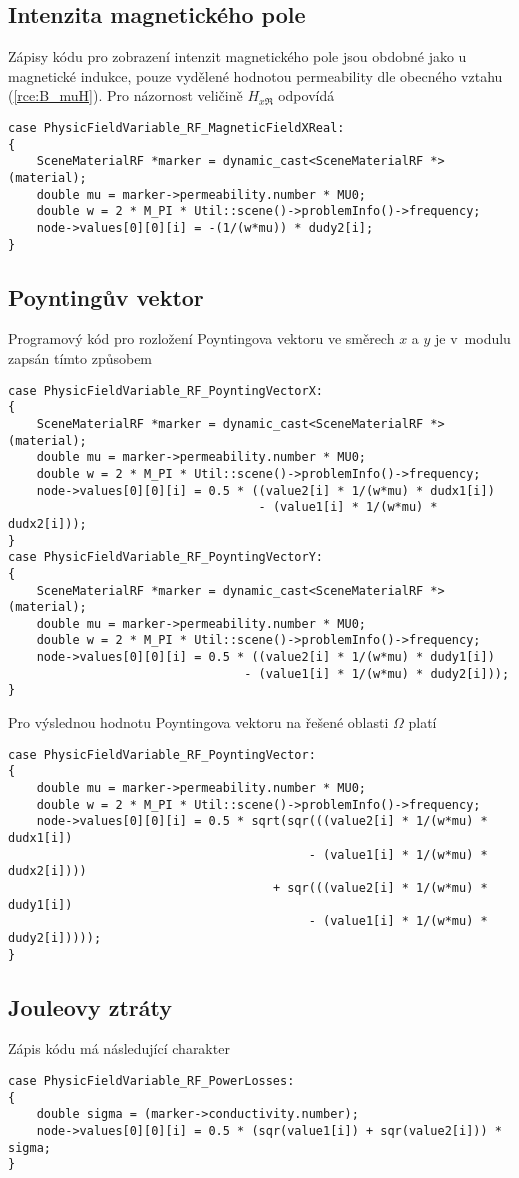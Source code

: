 \subsection*{Intenzita magnetického pole}
Zápisy kódu pro zobrazení intenzit magnetického pole jsou obdobné jako u magnetické indukce, pouze vydělené hodnotou permeability dle obecného vztahu (\ref{rce:B_muH}).
Pro názornost veličině $H_{x\Re}$ odpovídá
\begin{verbatim}
case PhysicFieldVariable_RF_MagneticFieldXReal:
{
    SceneMaterialRF *marker = dynamic_cast<SceneMaterialRF *>(material);
    double mu = marker->permeability.number * MU0;
    double w = 2 * M_PI * Util::scene()->problemInfo()->frequency;
    node->values[0][0][i] = -(1/(w*mu)) * dudy2[i];
}
\end{verbatim}

\subsection*{Poyntingův vektor}
Programový kód pro rozložení Poyntingova vektoru ve směrech $x$ a $y$ je v~modulu zapsán tímto způsobem
\begin{verbatim}
case PhysicFieldVariable_RF_PoyntingVectorX:
{
    SceneMaterialRF *marker = dynamic_cast<SceneMaterialRF *>(material);
    double mu = marker->permeability.number * MU0;
    double w = 2 * M_PI * Util::scene()->problemInfo()->frequency;
    node->values[0][0][i] = 0.5 * ((value2[i] * 1/(w*mu) * dudx1[i]) 
                                   - (value1[i] * 1/(w*mu) * dudx2[i]));
}
case PhysicFieldVariable_RF_PoyntingVectorY:
{
    SceneMaterialRF *marker = dynamic_cast<SceneMaterialRF *>(material);
    double mu = marker->permeability.number * MU0;
    double w = 2 * M_PI * Util::scene()->problemInfo()->frequency;
    node->values[0][0][i] = 0.5 * ((value2[i] * 1/(w*mu) * dudy1[i]) 
                                 - (value1[i] * 1/(w*mu) * dudy2[i]));
}
\end{verbatim}
Pro výslednou hodnotu Poyntingova vektoru na řešené oblasti $\Omega$ platí
\begin{verbatim}
case PhysicFieldVariable_RF_PoyntingVector:
{
    double mu = marker->permeability.number * MU0;
    double w = 2 * M_PI * Util::scene()->problemInfo()->frequency;
    node->values[0][0][i] = 0.5 * sqrt(sqr(((value2[i] * 1/(w*mu) * dudx1[i]) 
                                          - (value1[i] * 1/(w*mu) * dudx2[i]))) 
                                     + sqr(((value2[i] * 1/(w*mu) * dudy1[i]) 
                                          - (value1[i] * 1/(w*mu) * dudy2[i]))));
}
\end{verbatim}

\subsection*{Jouleovy ztráty}
Zápis kódu má následující charakter
\begin{verbatim}
case PhysicFieldVariable_RF_PowerLosses:
{
    double sigma = (marker->conductivity.number);
    node->values[0][0][i] = 0.5 * (sqr(value1[i]) + sqr(value2[i])) * sigma;
}
\end{verbatim}
